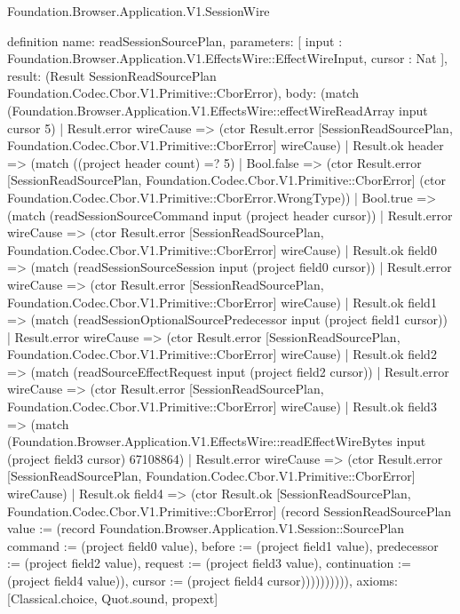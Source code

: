 \begin{lexlean}{Foundation.Browser.Application.V1.SessionWire}
\begin{semanticmodule}
definition{
  name: readSessionSourcePlan,
  parameters: [
    input : Foundation.Browser.Application.V1.EffectsWire::EffectWireInput,
    cursor : Nat
  ],
  result: (Result SessionReadSourcePlan Foundation.Codec.Cbor.V1.Primitive::CborError),
  body: (match (Foundation.Browser.Application.V1.EffectsWire::effectWireReadArray input cursor 5)
    | Result.error wireCause => (ctor Result.error [SessionReadSourcePlan, Foundation.Codec.Cbor.V1.Primitive::CborError] wireCause)
    | Result.ok header => (match ((project header count) =? 5)
      | Bool.false => (ctor Result.error [SessionReadSourcePlan, Foundation.Codec.Cbor.V1.Primitive::CborError] (ctor Foundation.Codec.Cbor.V1.Primitive::CborError.WrongType))
      | Bool.true => (match (readSessionSourceCommand input (project header cursor))
        | Result.error wireCause => (ctor Result.error [SessionReadSourcePlan, Foundation.Codec.Cbor.V1.Primitive::CborError] wireCause)
        | Result.ok field0 => (match (readSessionSourceSession input (project field0 cursor))
          | Result.error wireCause => (ctor Result.error [SessionReadSourcePlan, Foundation.Codec.Cbor.V1.Primitive::CborError] wireCause)
          | Result.ok field1 => (match (readSessionOptionalSourcePredecessor input (project field1 cursor))
            | Result.error wireCause => (ctor Result.error [SessionReadSourcePlan, Foundation.Codec.Cbor.V1.Primitive::CborError] wireCause)
            | Result.ok field2 => (match (readSourceEffectRequest input (project field2 cursor))
              | Result.error wireCause => (ctor Result.error [SessionReadSourcePlan, Foundation.Codec.Cbor.V1.Primitive::CborError] wireCause)
              | Result.ok field3 => (match (Foundation.Browser.Application.V1.EffectsWire::readEffectWireBytes input (project field3 cursor) 67108864)
                | Result.error wireCause => (ctor Result.error [SessionReadSourcePlan, Foundation.Codec.Cbor.V1.Primitive::CborError] wireCause)
                | Result.ok field4 => (ctor Result.ok [SessionReadSourcePlan, Foundation.Codec.Cbor.V1.Primitive::CborError] (record SessionReadSourcePlan {value := (record Foundation.Browser.Application.V1.Session::SourcePlan {command := (project field0 value), before := (project field1 value), predecessor := (project field2 value), request := (project field3 value), continuation := (project field4 value)}), cursor := (project field4 cursor)}))))))))),
  axioms: [Classical.choice, Quot.sound, propext]
}


\end{semanticmodule}
\end{lexlean}
